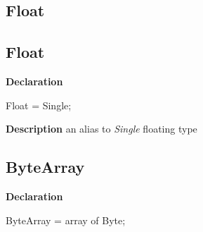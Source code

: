 \documentclass{report}
\newif\ifpdf
\begin{document}
\subsection*{\large{\textbf{Float}}\normalsize\hspace{1ex}\hrulefill}
\else
\subsection*{Float}
\fi
\label{NewPascal.Base-Float}
\begin{list}{}{
\setlength{\itemindent}{0cm}
\setlength{\listparindent}{0cm}
\setlength{\leftmargin}{\evensidemargin}
\addtolength{\leftmargin}{\tmplength}
\settowidth{\labelsep}{X}
\addtolength{\leftmargin}{\labelsep}
\setlength{\labelwidth}{\tmplength}
}
\item[\textbf{Declaration}\hfill]
\ifpdf
\begin{flushleft}
\fi
\begin{ttfamily}
Float = Single;\end{ttfamily}

\ifpdf
\end{flushleft}
\fi

\par
\item[\textbf{Description}]
an alias to \textit{Single} floating type

\end{list}
\ifpdf
\subsection*{\large{\textbf{ByteArray}}\normalsize\hspace{1ex}\hrulefill}
\else
\subsection*{ByteArray}
\fi
\label{NewPascal.Base-ByteArray}
\begin{list}{}{
\setlength{\itemindent}{0cm}
\setlength{\listparindent}{0cm}
\setlength{\leftmargin}{\evensidemargin}
\addtolength{\leftmargin}{\tmplength}
\settowidth{\labelsep}{X}
\addtolength{\leftmargin}{\labelsep}
\setlength{\labelwidth}{\tmplength}
}
\item[\textbf{Declaration}\hfill]
\ifpdf
\begin{flushleft}
\fi
\begin{ttfamily}
ByteArray = array of Byte;\end{ttfamily}

\ifpdf
\end{flushleft}
\fi

\end{list}
\ifpdf
\end{document}
